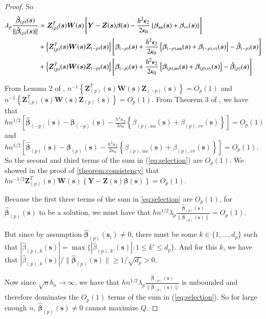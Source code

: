 \documentclass[authoryear, review, 11pt]{elsarticle}
\begin{document}
\begin{proof}
        So
        \begin{align}
            \lambda_p \frac{ \hat{\bm{\beta}}_{(p)}(\bm{s}) }{\| \hat{\bm{\beta}}_{(p)}(\bm{s}) \|} &= \bm{Z}_{(p)}^T(\bm{s}) \bm{W}(\bm{s}) \left[ \bm{Y} - \bm{Z}(\bm{s}) \bm{\beta}(\bm{s}) - \frac{h^2 \kappa_2}{2 \kappa_0} \left\{ \bm{\beta}_{uu}(\bm{s}) + \bm{\beta}_{vv}(\bm{s}) \right\} \right] \notag \\ 
            &+ \left\{ \bm{Z}_{(p)}^T(\bm{s}) \bm{W}(\bm{s}) \bm{Z}_{(-p)}(\bm{s}) \right\} \left[ \bm{\beta}_{(-p)}(\bm{s}) + \frac{h^2 \kappa_2}{2 \kappa_0} \left\{ \bm{\beta}_{(-p),uu}(\bm{s}) + \bm{\beta}_{(-p),vv}(\bm{s}) \right\} - \hat{\bm{\beta}}_{(-p)}(\bm{s}) \right] \notag \\
            &+ \left\{ \bm{Z}_{(p)}^T(\bm{s}) \bm{W}(\bm{s}) \bm{Z}_{(-p)}(\bm{s}) \right\} \left[ \bm{\beta}_{(-p)}(\bm{s}) + \frac{h^2 \kappa_2}{2 \kappa_0} \left\{ \bm{\beta}_{(p),uu}(\bm{s}) + \bm{\beta}_{(p),vv}(\bm{s}) \right\} - \hat{\bm{\beta}}_{(p)}(\bm{s}) \right]
        \end{align}

        From Lemma 2 of \cite{Sun-Yan-Zhang-Lu-2014}, $n^{-1} \left\{ \bm{Z}_{(p)}^T(\bm{s}) \bm{W}(\bm{s}) \bm{Z}_{(-p)}(\bm{s}) \right\} = O_p(1)$ and $n^{-1} \left\{ \bm{Z}_{(p)}^T(\bm{s}) \bm{W}(\bm{s}) \bm{Z}_{(p)}(\bm{s}) \right\} = O_p(1)$. From Theorem 3 of \cite{Sun-Yan-Zhang-Lu-2014}, we have that $h n^{1/2} \left[ \hat{\bm{\beta}}_{(-p)} (\bm{s}) - \bm{\beta}_{(-p)}(\bm{s}) - \frac{h^2 \kappa_2}{2 \kappa_0} \left\{ \beta_{(p),uu}(\bm{s}) + \beta_{(p),vv}(\bm{s}) \right\}\right] = O_p(1)$ and $h n^{1/2} \left[ \hat{\bm{\beta}}_{(p)}(\bm{s}) - \bm{\beta}_{(p)}(\bm{s}) - \frac{h^2 \kappa_2}{2 \kappa_0} \left\{ \beta_{(p),uu}(\bm{s}) + \beta_{(p),vv}(\bm{s}) \right\} \right] = O_p(1)$. So the second and third terms of the sum in (\ref{eq:selection}) are $O_p(1)$. We showed in the proof of \ref{theorem:consistency} that $h  n^{-1/2} \bm{Z}_{(p)}^T(\bm{s}) \bm{W}(\bm{s}) \left\{ \bm{Y} - \bm{Z}(\bm{s}) \bm{\beta}(\bm{s}) \right\} = O_p(1)$.

        Because the first three terms of the sum in \ref{eq:selection} are $O_p(1)$, for $\hat{\bm{\beta}}_{(p)} (\bm{s})$ to be a solution, we must have that $h n^{1/2} \lambda_p \frac{ \hat{\bm{\beta}}_{(p)} (\bm{s}) }{\| \hat{\bm{\beta}}_{(p)} (\bm{s}) \|} = O_p(1)$.

        But since by assumption $\hat{\bm{\beta}}_{(p)} (\bm{s}_i) \ne 0$, there must be some $k \in \{ 1, \dots, d_p \}$ such that $ | \hat{\beta}_{(p),k} (\bm{s}) | = \max \{ | \hat{\beta}_{(p),k'} (\bm{s}) | : 1 \le k' \le d_p \} $. And for this $k$, we have that $| \hat{\beta}_{(p),k} (\bm{s}) | / \| \hat{\bm{\beta}}_{(p)} (\bm{s}) \| \ge 1 / \sqrt{d_p} > 0$.

        Now since $\sqrt{n} b_n \to \infty$, we have that $h n^{1/2} \lambda_p \frac{ \hat{\bm{\beta}}_{(p)} (\bm{s}) }{\| \hat{\bm{\beta}}_{(p)} (\bm{s}) \|}$ is unbounded and therefore dominates the $O_p(1)$ terms of the sum in (\ref{eq:selection}). So for large enough $n$, $\hat{\bm{\beta}}_{(p)} (\bm{s}) \ne 0$ cannot maximize $Q$.
    \end{proof}
\end{document}
